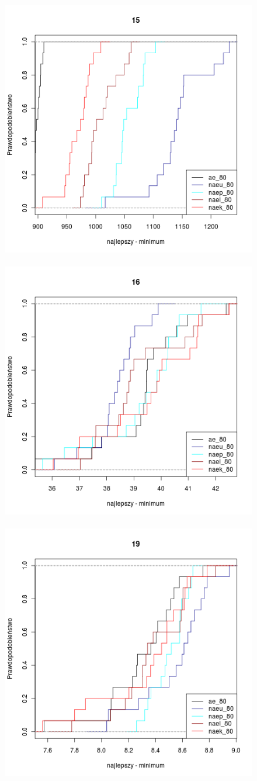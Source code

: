 \documentclass[12pt, a4paper]{article}
\begin{document}
\begin{figure}[H]
\centering
\mbox{
  {\includegraphics[width=.35\textwidth]{../pngs/80/15.png} }
  {\includegraphics[width=.35\textwidth]{../pngs/80/16.png} }
  {\includegraphics[width=.35\textwidth]{../pngs/80/19.png} }}
\end{figure}
\end{document}
